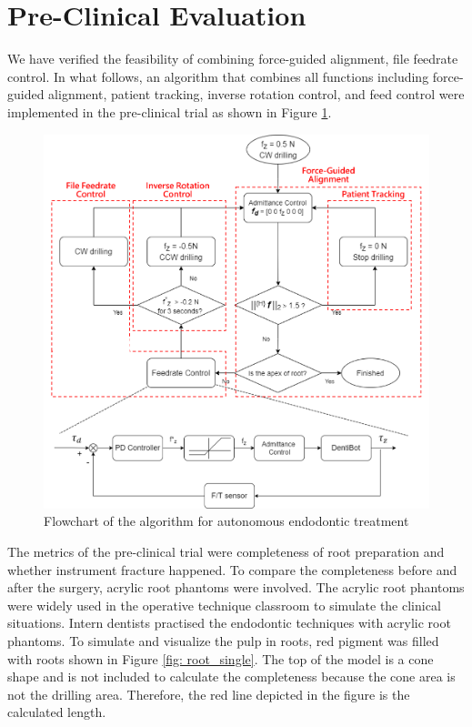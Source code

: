 \section{Pre-Clinical Evaluation}
\hspace*{6mm}We have verified the feasibility of combining force-guided alignment, file feedrate control. In what follows, an algorithm that combines all functions including force-guided alignment, patient tracking, inverse rotation control, and feed control were implemented in the pre-clinical trial as shown in Figure \ref{fig: exp2_motion planning}.
\begin{figure}[htbp]
\begin{center}
\includegraphics[width=1\linewidth]{Images/algorithm.png}
\end{center}
\caption{
Flowchart of the algorithm for autonomous endodontic treatment
}\label{fig: exp2_motion planning}
\end{figure}
\par
The metrics of the pre-clinical trial were completeness of root preparation and whether instrument fracture happened. To compare the completeness before and after the surgery, acrylic root phantoms were involved. The acrylic root phantoms were widely used in the operative technique classroom to simulate the clinical situations. Intern dentists practised the endodontic techniques with acrylic root phantoms. To simulate and visualize the pulp in roots, red pigment was filled with roots shown in Figure \ref{fig: root_single}. The top of the model is a cone shape and is not included to calculate the completeness because the cone area is not the drilling area. Therefore, the red line depicted in the figure is the calculated length. 
